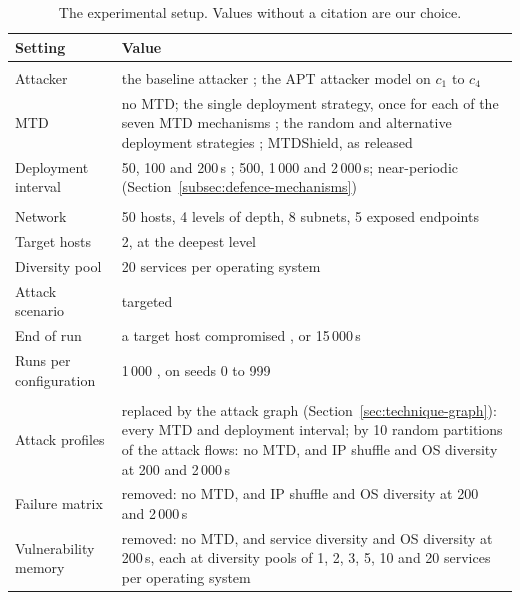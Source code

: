 \begin{table}[t]
  \centering
  \caption[The experimental setup]{The experimental setup. Values without a citation are our choice.}
  \label{tab:experiment}
  \tablestyle
  \begin{tabular}{@{}P{3.9cm}P{11.0cm}@{}}
    \toprule
    Setting & Value \\
    \midrule
     \\
    \quad Attacker & the baseline attacker \citep{brown2023}; the APT attacker model on $c_1$ to $c_4$ \\
    \quad MTD & no MTD; the single deployment strategy, once for each of the seven MTD mechanisms \citep{brown2023, zhang2023}; the random and alternative deployment strategies \citep{zhang2023}; MTDShield, as released \citep{tay2024} \\
    \quad Deployment interval & 50, 100 and 200\,s \citep{zhang2023, ho2024}; 500, 1\,000 and 2\,000\,s; near-periodic (Section~\ref{subsec:defence-mechanisms}) \citep{tay2024code} \\
    \addlinespace
     \\
    \quad Network & 50 hosts, 4 levels of depth, 8 subnets, 5 exposed endpoints \citep{tay2024code} \\
    \quad Target hosts & 2, at the deepest level \citep{tay2024code} \\
    \quad Diversity pool & 20 services per operating system \citep{tay2024code} \\
    \quad Attack scenario & targeted \citep{brown2023} \\
    \quad End of run & a target host compromised \citep{brown2023}, or 15\,000\,s \citep{ho2024} \\
    \quad Runs per configuration & 1\,000 \citep{arcuri2014hitchhiker}, on seeds 0 to 999 \\
    \addlinespace
     \\
    \quad Attack profiles & replaced by the attack graph (Section~\ref{sec:technique-graph}): every MTD and deployment interval; by 10 random partitions of the attack flows: no MTD, and IP shuffle and OS diversity at 200 and 2\,000\,s \\
    \quad Failure matrix & removed: no MTD, and IP shuffle and OS diversity at 200 and 2\,000\,s \\
    \quad Vulnerability memory & removed: no MTD, and service diversity and OS diversity at 200\,s, each at diversity pools of 1, 2, 3, 5, 10 and 20 services per operating system \\
    \bottomrule
  \end{tabular}
\end{table}
